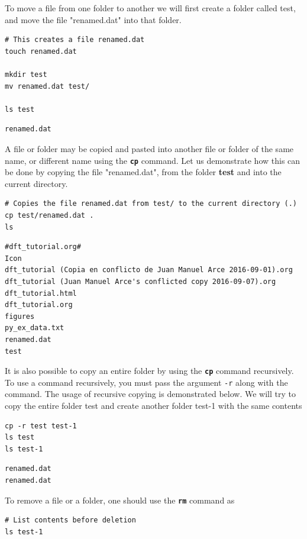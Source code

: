 \documentclass[11pt]{article}
\begin{document}
\begin{enumerate}
To move a file from one folder to another we will first create a folder called test, and move the file "renamed.dat" into that folder. 
\begin{verbatim}
# This creates a file renamed.dat
touch renamed.dat

mkdir test
mv renamed.dat test/

ls test
\end{verbatim}

\begin{verbatim}
renamed.dat
\end{verbatim}

A file or folder may be copied and pasted into another file or folder of the same name, or different name using the \textbf{\texttt{cp}} command. Let us demonstrate how this can be done by copying the file "renamed.dat", from the folder \textbf{test} and into the current directory.
\begin{verbatim}
# Copies the file renamed.dat from test/ to the current directory (.)
cp test/renamed.dat .
ls
\end{verbatim}

\begin{verbatim}
#dft_tutorial.org#
Icon
dft_tutorial (Copia en conflicto de Juan Manuel Arce 2016-09-01).org
dft_tutorial (Juan Manuel Arce's conflicted copy 2016-09-07).org
dft_tutorial.html
dft_tutorial.org
figures
py_ex_data.txt
renamed.dat
test
\end{verbatim}

It is also possible to copy an entire folder by using the \textbf{\texttt{cp}} command recursively. To use a command recursively, you must pass the argument \texttt{-r} along with the command. The usage of recursive copying is demonstrated below. We will try to copy the entire folder test and create another folder test-1 with the same contents
\begin{verbatim}
cp -r test test-1
ls test
ls test-1
\end{verbatim}

\begin{verbatim}
renamed.dat
renamed.dat
\end{verbatim}

To remove a file or a folder, one should use the \textbf{\texttt{rm}} command as 
\begin{verbatim}
# List contents before deletion
ls test-1


\end{verbatim}
\end{enumerate}
\end{document}
